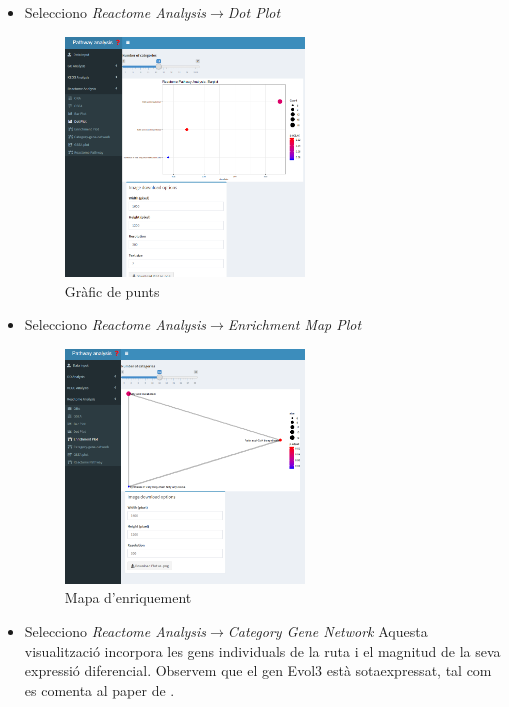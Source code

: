 \begin{enumerate}
\begin{itemize}
\item Selecciono \textit{Reactome Analysis}$\rightarrow$\textit{Dot Plot}

\begin{figure}[H]
\centering
\includegraphics[width=0.6\textwidth]{figures/Estudi1_Fig5_ORA_Dot_RA.png} 
\caption{Gràfic de punts}
\end{figure}

\item Selecciono \textit{Reactome Analysis}$\rightarrow$\textit{Enrichment Map Plot}

\begin{figure}[H]
\centering
\includegraphics[width=0.6\textwidth]{figures/Estudi1_Fig6_ORA_EP_RA.png} 
\caption{Mapa d'enriquement}
\end{figure}

\item Selecciono \textit{Reactome Analysis}$\rightarrow$\textit{Category Gene Network}
Aquesta visualització incorpora les gens individuals de la ruta i el magnitud de la seva expressió diferencial. Observem que el gen Evol3 està sotaexpressat, tal com es comenta al paper de \cite{li2017zbtb7b}.


\end{itemize}
\end{enumerate}
